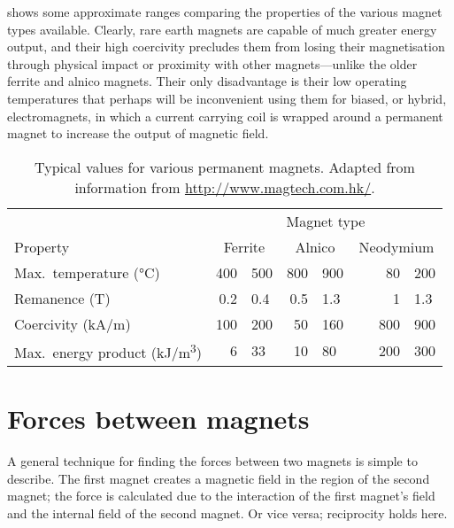  shows some approximate ranges comparing the
properties of the various magnet types available. Clearly, rare earth
magnets are capable of much greater energy output, and their high
coercivity precludes them from losing their magnetisation through
physical impact or proximity with other magnets---unlike the older
ferrite and alnico magnets. Their only disadvantage is their low
operating temperatures that perhaps will be inconvenient using them
for biased, or hybrid, electromagnets, in which a current carrying
coil is wrapped around a permanent magnet to increase the output of
magnetic field.

\begin{table}
  \centering
  \begin{tabular}{@{} l r@{\,--\,}l r@{\,--\,}l r@{\,--\,}l @{}}
    \toprule
    & \multicolumn{6}{c}{Magnet type}\\
    \cmidrule{2-6}
    Property            & \multicolumn{2}{c}{Ferrite}
                        & \multicolumn{2}{c}{Alnico}
                        & \multicolumn{2}{c}{Neodymium}  \\
    \midrule
    Max.\ temperature (°C)    & \num{400} & \num{500} & \num{800} & \num{900} &    \num{ 80} & \num{200}  \\
    Remanence (T)             & \num{0.2} & \num{0.4} & \num{0.5} & \num{1.3} &    \num{  1} & \num{1.3}  \\
    Coercivity (\si{kA/m})    & \num{100} & \num{200} & \num{50 } & \num{160} & ~~~\num{800} & \num{900}  \\
    Max.\ energy product
               (\si{kJ/m^3})  & \num{6}   & \num{33}  & \num{10}  & \num{80}  &    \num{200} & \num{300}  \\
    \bottomrule
  \end{tabular}
  \caption[Typical values for various permanent magnets.]
  {Typical values for various permanent magnets.
   Adapted from information from \url{http://www.magtech.com.hk/}.}
\end{table}




\section{Forces between magnets}


\textcite{bassani2006}

A general technique for finding the forces between two magnets is
simple to describe. The first magnet creates a magnetic field in the
region of the second magnet; the force is calculated due to the
interaction of the first magnet's field and the internal field of the
second magnet. Or vice versa; reciprocity holds here.


